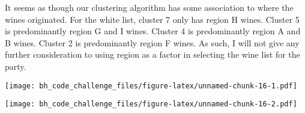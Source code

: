 \documentclass[
]{article}
\newenvironment{Shaded}{\begin{snugshade}}{\end{snugshade}}
\newcommand{\CommentTok}[1]{\textcolor[rgb]{0.56,0.35,0.01}{\textit{#1}}}
\newcommand{\DataTypeTok}[1]{\textcolor[rgb]{0.13,0.29,0.53}{#1}}
\newcommand{\KeywordTok}[1]{\textcolor[rgb]{0.13,0.29,0.53}{\textbf{#1}}}
\newcommand{\NormalTok}[1]{#1}
\newcommand{\OperatorTok}[1]{\textcolor[rgb]{0.81,0.36,0.00}{\textbf{#1}}}
\newcommand{\OtherTok}[1]{\textcolor[rgb]{0.56,0.35,0.01}{#1}}
\newcommand{\StringTok}[1]{\textcolor[rgb]{0.31,0.60,0.02}{#1}}
\begin{document}
It seems as though our clustering algorithm has some association to
where the wines originated. For the white list, cluster 7 only has
region H wines. Cluster 5 is predominantly region G and I wines. Cluster
4 is predominantly region A and B wines. Cluster 2 is predominantly
region F wines. As such, I will not give any further consideration to
using region as a factor in selecting the wine list for the party.

\begin{Shaded}
\end{Shaded}

\texttt{[image: bh\_code\_challenge\_files/figure-latex/unnamed-chunk-16-1.pdf]}

\begin{Shaded}
\end{Shaded}

\texttt{[image: bh\_code\_challenge\_files/figure-latex/unnamed-chunk-16-2.pdf]}

\begin{Shaded}
\end{Shaded}
\end{document}
